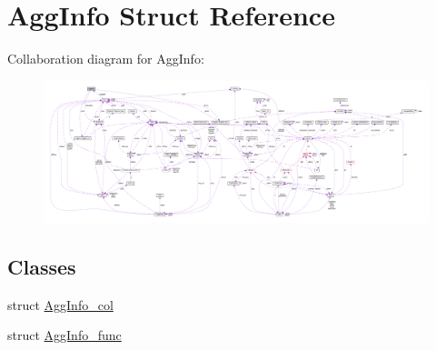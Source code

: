 \hypertarget{struct_agg_info}{\section{Agg\-Info Struct Reference}
\label{struct_agg_info}
}


Collaboration diagram for Agg\-Info\-:\nopagebreak
\begin{figure}[H]
\begin{center}
\leavevmode
\includegraphics[width=350pt]{struct_agg_info__coll__graph}
\end{center}
\end{figure}
\subsection*{Classes}
\begin{DoxyCompactItemize}
\item 
struct \hyperlink{struct_agg_info_1_1_agg_info__col}{Agg\-Info\-\_\-col}
\item 
struct \hyperlink{struct_agg_info_1_1_agg_info__func}{Agg\-Info\-\_\-func}
\end{DoxyCompactItemize}
